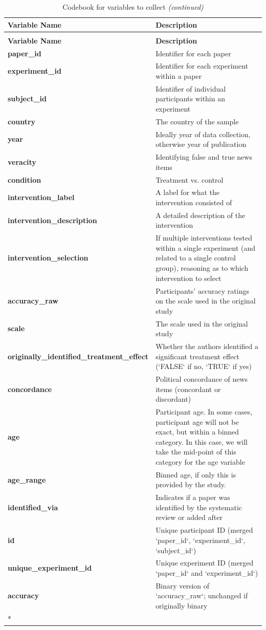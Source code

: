 \documentclass[
  man,mask,floatsintext]{apa6}
\begin{document}
\begin{longtable}[t]{>{}l>{\raggedright\arraybackslash}p{25em}}
\caption{\label{tab:codebook}Codebook for variables to collect}\\
\toprule
\textbf{Variable Name} & \textbf{Description}\\
\midrule
\endfirsthead
\caption[]{\label{tab:codebook}Codebook for variables to collect \textit{(continued)}}\\
\toprule
\textbf{Variable Name} & \textbf{Description}\\
\midrule
\endhead

\endfoot
\bottomrule
\endlastfoot
\textbf{paper\_id} & Identifier for each paper\\
\textbf{experiment\_id} & Identifier for each experiment within a paper\\
\textbf{subject\_id} & Identifier of individual participants within an experiment\\
\textbf{country} & The country of the sample\\
\textbf{year} & Ideally year of data collection, otherwise year of publication\\
\addlinespace
\textbf{veracity} & Identifying false and true news items\\
\textbf{condition} & Treatment vs. control\\
\textbf{intervention\_label} & A label for what the intervention consisted of\\
\textbf{intervention\_description} & A detailed description of the intervention\\
\textbf{intervention\_selection} & If multiple interventions tested within a single experiment (and related to a single control group), reasoning as to which intervention to select\\
\addlinespace
\textbf{accuracy\_raw} & Participants' accuracy ratings on the scale used in the original study\\
\textbf{scale} & The scale used in the original study\\
\textbf{originally\_identified\_treatment\_effect} & Whether the authors identified a significant treatment effect (`FALSE` if no, `TRUE` if yes)\\
\textbf{concordance} & Political concordance of news items (concordant or discordant)\\
\textbf{age} & Participant age. In some cases, participant age will not be exact, but within a binned category. In this case, we will take the mid-point of this category for the age variable\\
\addlinespace
\textbf{age\_range} & Binned age, if only this is provided by the study.\\
\textbf{identified\_via} & Indicates if a paper was identified by the systematic review or added after\\
\textbf{id} & Unique participant ID (merged `paper\_id`, `experiment\_id`, `subject\_id`)\\
\textbf{unique\_experiment\_id} & Unique experiment ID (merged `paper\_id` and `experiment\_id`)\\
\textbf{accuracy} & Binary version of `accuracy\_raw`; unchanged if originally binary\\*
\end{longtable}
\end{document}
